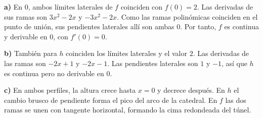 \textbf{a)} En $0$, ambos límites laterales de $f$ coinciden con $f(0)=2$. Las derivadas de sus ramas son $3x^2-2x$ y $-3x^2-2x$. Como las ramas polinómicas coinciden en el punto de unión, sus pendientes laterales allí son ambas $0$. Por tanto, $f$ es continua y derivable en $0$, con $f'(0)=0$.

\textbf{b)} También para $h$ coinciden los límites laterales y el valor $2$. Las derivadas de las ramas son $-2x+1$ y $-2x-1$. Las pendientes laterales son $1$ y $-1$, así que $h$ es continua pero no derivable en $0$.

\textbf{c)} En ambos perfiles, la altura crece hasta $x=0$ y decrece después. En $h$ el cambio brusco de pendiente forma el pico del arco de la catedral. En $f$ las dos ramas se unen con tangente horizontal, formando la cima redondeada del túnel.
